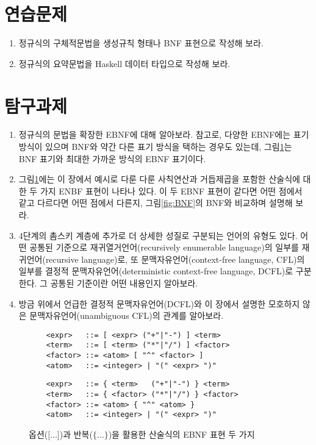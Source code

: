\section*{연습문제}
\begin{enumerate}
 \item 정규식의 구체적문법을 생성규칙 형태나 BNF 표현으로 작성해 보라.
 \item 정규식의 요약문법을 Haskell 데이터 타입으로 작성해 보라.
\end{enumerate}

\section*{탐구과제}
\begin{enumerate}[itemsep=0pt]
 \item 정규식의 문법을 확장한 EBNF에 대해 알아보라.
       참고로, 다양한 EBNF에는 표기 방식이 있으며 BNF와 약간 다른
       표기 방식을 택하는 경우도 있는데, 그림\;\ref{fig:EBNF}는
       BNF 표기와 최대한 가까운 방식의 EBNF 표기이다.
 \item 그림\;\ref{fig:EBNF}에는 이 장에서 예시로 다룬 다룬 사칙연산과
       거듭제곱을 포함한 산술식에 대한 두 가지 ENBF 표현이 나타나 있다.
       이 두 EBNF 표현이 같다면 어떤 점에서 같고 다르다면 어떤 점에서
       다른지, 그림\;\ref{fig:BNF}의 BNF와 비교하며 설명해 보라.
 \item 4단계의 촘스키 계층에 추가로 더 상세한 성질로 구분되는 언어의
      유형도 있다. 어떤 공통된 기준으로 재귀열거언어(recursively
      enumerable language)의 일부를 재귀언어(recursive language)로,
      또 문맥자유언어(context-free language, CFL)의 일부를 결정적
      문맥자유언어(deterministic context-free language, DCFL)로 구분한다.
      그 공통된 기준이란 어떤 내용인지 알아보라.
 \item 방금 위에서 언급한 결정적 문맥자유언어(DCFL)와 이 장에서 설명한
       모호하지 않은 문맥자유언어(unambiguous CFL)의 관계를 알아보라.
\end{enumerate}


\begin{figure}[b]
\begin{lstlisting}
    <expr>   ::= [ <expr> ("+"|"-") ] <term>
    <term>   ::= [ <term> ("*"|"/") ] <factor>
    <factor> ::= <atom> [ "^" <factor> ]
    <atom>   ::= <integer> | "(" <expr> ")"
\end{lstlisting}

\begin{lstlisting}
    <expr>   ::= { <term>   ("+"|"-") } <term>
    <term>   ::= { <factor> ("*"|"/") } <factor>
    <factor> ::= <atom> { "^" <atom> }
    <atom>   ::= <integer> | "(" <expr> ")"
\end{lstlisting}
\caption{옵션($\texttt{[}\ldots\texttt{]}$)과
         반복($\texttt{\{}\ldots\texttt{\}}$)을
         활용한 산술식의 EBNF 표현 두 가지
         \label{fig:EBNF}}
\end{figure}



